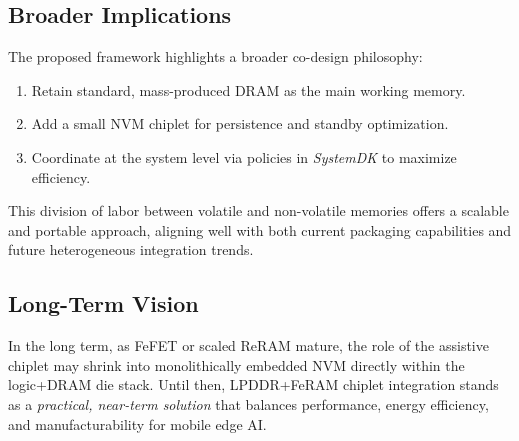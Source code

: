 \subsection{Broader Implications}
The proposed framework highlights a broader co-design philosophy:
\begin{enumerate}
  \item Retain standard, mass-produced DRAM as the main working memory.
  \item Add a small NVM chiplet for persistence and standby optimization.
  \item Coordinate at the system level via policies in \emph{SystemDK} to maximize efficiency.
\end{enumerate}
This division of labor between volatile and non-volatile memories offers a scalable and portable approach, aligning well with both current packaging capabilities and future heterogeneous integration trends.

\subsection{Long-Term Vision}
In the long term, as FeFET or scaled ReRAM mature, the role of the assistive chiplet may shrink into monolithically embedded NVM directly within the logic+DRAM die stack. 
Until then, LPDDR+FeRAM chiplet integration stands as a \emph{practical, near-term solution} that balances performance, energy efficiency, and manufacturability for mobile edge AI.
